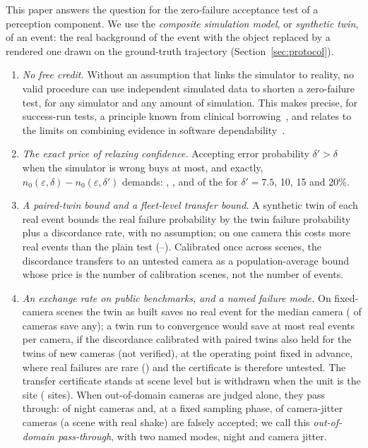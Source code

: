 This paper answers the question for the zero-failure acceptance test of a perception component. We use the
\emph{composite simulation model}, or \emph{synthetic twin}, of an event: the real background of the event with the
object replaced by a rendered one drawn on the ground-truth trajectory (Section~\ref{sec:protocol}).
\begin{enumerate}
\item \emph{No free credit.} Without an assumption that links the simulator to reality, no valid procedure can use
independent simulated data to shorten a zero-failure test, for any simulator and any amount of simulation.
This makes precise, for success-run tests, a principle known from clinical
borrowing~\cite{koppschneider2020}, and relates to the limits on combining evidence in software
dependability~\cite{littlewood1993}.
\item \emph{The exact price of relaxing confidence.} Accepting error probability $\delta'>\delta$ when the simulator is
wrong buys at most, and exactly, $n_0(\varepsilon,\delta)-n_0(\varepsilon,\delta')$ demands: \ncExactA, \ncExactB,
\ncExactC{} and \ncExactD{} of the \nNzero{} for $\delta'=7.5$, 10, 15 and 20\%.
\item \emph{A paired-twin bound and a fleet-level transfer bound.} A synthetic twin of each real event bounds the real
failure probability by the twin failure probability plus a discordance rate, with no assumption; on one camera this
costs more real events than the plain test (\nCthreeA--\nCthreeC). Calibrated once across scenes, the discordance
transfers to an untested camera as a population-average bound whose price is the number of calibration scenes, not the
number of events.
\item \emph{An exchange rate on public benchmarks, and a named failure mode.} On \nMainScenes{} fixed-camera scenes the twin
as built saves no real event for the median camera (\nTcamfinOPS{} of \nMainScenes{} cameras save any); a twin run to convergence would save at most \nSavedOP{} real events per camera, if the discordance calibrated with
paired twins also held for the twins of new cameras (not verified), at the
operating point fixed in advance, where real failures are rare (\nPmainOP) and the certificate is therefore untested.
The transfer certificate stands at scene level but is withdrawn when the unit is the site (\nSiteSm{} sites).
When out-of-domain cameras are judged alone, they pass through: \nNightFC{} of \nNightScenes{} night cameras and, at a
fixed sampling phase, \nOODSJitfa{} of \nJitterScenes{} camera-jitter cameras (a scene with real shake) are falsely accepted; we call this
\emph{out-of-domain pass-through}, with two named modes, night and camera jitter.
\end{enumerate}

